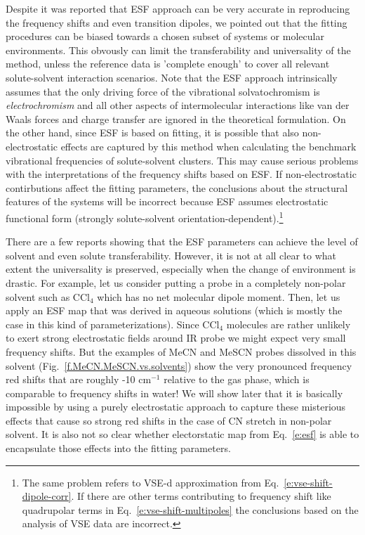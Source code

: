 \documentclass[a4paper,titlepage,twoside,fleqn,12pt]{book}
\begin{document}
\begin{refsection}
Despite it was reported that ESF approach can be very accurate in reproducing the frequency shifts and even
transition dipoles, we pointed out that the fitting procedures
can be biased towards a chosen subset of systems or molecular environments. This obvously can limit
the transferability and universality of the method, unless the reference data is 'complete enough'
to cover all relevant solute-solvent interaction scenarios. Note that the ESF approach intrinsically
assumes that the only driving force of the vibrational solvatochromism is \emph{electrochromism}
and all other aspects of intermolecular interactions like van der Waals forces and charge transfer are
ignored in the theoretical formulation. On the other hand, since ESF is based on fitting, it is 
possible that also non-electrostatic effects are captured by this method when calculating the benchmark 
vibrational frequencies of solute-solvent clusters. This may cause serious problems with the interpretations
of the frequency shifts based on ESF. If non-electrostatic contirbutions affect the fitting
parameters, the conclusions about the structural features of the systems will be incorrect 
because ESF assumes electrostatic functional form (strongly solute-solvent orientation-dependent).\footnote{
The same problem refers to VSE-d approximation from Eq.~\eqref{e:vse-shift-dipole-corr}.
If there are other terms contributing to frequency shift like quadrupolar terms 
in Eq.~\eqref{e:vse-shift-multipoles} the conclusions based
on the analysis of VSE data are incorrect.}

There are a few reports showing that the ESF parameters can achieve the level of solvent
and even solute transferability. However, it is not at all clear to what extent the universality is
preserved, especially when the change of environment is drastic. For example, let us consider putting a probe in
a completely non-polar solvent such as CCl$_4$ which has no net molecular dipole moment. 
Then, let us apply an ESF map that was derived in aqueous solutions (which is mostly the case in this kind
of parameterizations). Since CCl$_4$ molecules are rather unlikely to exert strong electrostatic fields 
around IR probe we might expect very small frequency shifts. But the examples of MeCN and MeSCN probes
dissolved in this solvent (Fig.~\ref{f.MeCN.MeSCN.vs.solvents}) show the very pronounced frequency red shifts that are roughly -10 cm$^{-1}$
relative to the gas phase, which is comparable to frequency shifts in water! 
We will show later that it is basically impossible by using a purely electrostatic approach
to capture these misterious effects that cause so strong red shifts in the case of CN stretch in non-polar
solvent. It is also not so clear whether electorstatic map from Eq.~\eqref{e:esf} is able to 
encapsulate those effects into the fitting parameters.


\end{refsection}
\end{document}
